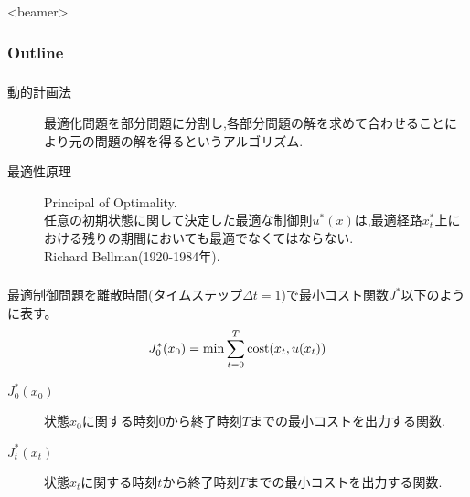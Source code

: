 \documentclass[dvipdfmx,12px]{beamer}
\begin{document}
  		\AtBeginSubsection[]{}
  		\begin{frame}<beamer>
  			\frametitle{Outline}
  		\end{frame}
			\begin{frame}
				\frametitle{\sectionTitleName{}}
				\begin{description}
					\item[動的計画法]
						最適化問題を部分問題に分割し,各部分問題の解を求めて合わせることにより元の問題の解を得るというアルゴリズム.
					\item[最適性原理]
						Principal of Optimality.\\
						任意の初期状態に関して決定した最適な制御則$u^{*}(x)$は,最適経路$x^{*}_t$上における残りの期間においても最適でなくてはならない.\\
						Richard Bellman(1920-1984年).
				\end{description}
			\end{frame}
			\begin{frame}
				\frametitle{\sectionTitleName{}}
				最適制御問題を離散時間(タイムステップ$\Delta t = 1$)で最小コスト関数$J^{*}$以下のように表す。
				\begin{align*}
					J^{*}_0 (x_0) = {\rm min} \sum_{t=0}^{T} {\rm cost}(x_t, u(x_t))
				\end{align*}
				\begin{description}
					\item[$J^{*}_0 (x_0)$] 状態$x_0$に関する時刻$0$から終了時刻$T$までの最小コストを出力する関数.
					\item[$J^{*}_t (x_t)$] 状態$x_t$に関する時刻$t$から終了時刻$T$までの最小コストを出力する関数.
				\end{description}
			\end{frame}
\end{document}
